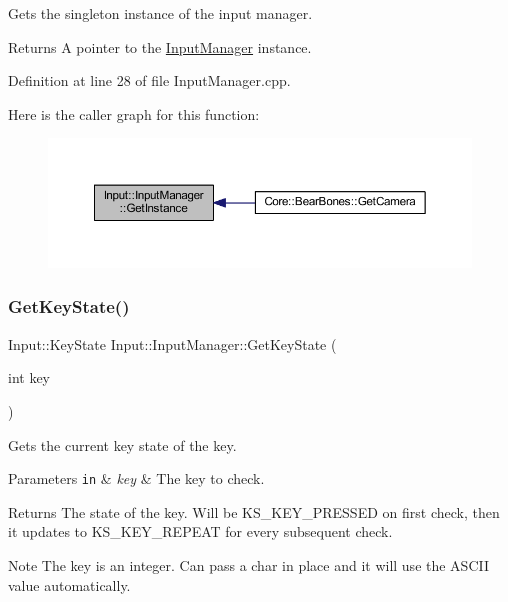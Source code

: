 Gets the singleton instance of the input manager. \begin{DoxyReturn}{Returns}
A pointer to the \hyperlink{class_input_1_1_input_manager}{Input\+Manager} instance. 
\end{DoxyReturn}


Definition at line 28 of file Input\+Manager.\+cpp.

Here is the caller graph for this function\+:
\nopagebreak
\begin{figure}[H]
\begin{center}
\leavevmode
\includegraphics[width=350pt]{class_input_1_1_input_manager_ac4df9b50e7cfc4e59f061a08ed7f4925_icgraph}
\end{center}
\end{figure}
\mbox{\label{class_input_1_1_input_manager_a6ac7c060e63c0f30563c29b9d2b41476}} 
\subsubsection{\texorpdfstring{Get\+Key\+State()}{GetKeyState()}}
{\footnotesize\ttfamily Input\+::\+Key\+State Input\+::\+Input\+Manager\+::\+Get\+Key\+State (\begin{DoxyParamCaption}\item[{int}]{key }\end{DoxyParamCaption})}

Gets the current key state of the key. 
\begin{DoxyParams}[1]{Parameters}
\mbox{\tt in}  & {\em key} & The key to check. \\
\hline
\end{DoxyParams}
\begin{DoxyReturn}{Returns}
The state of the key. Will be K\+S\+\_\+\+K\+E\+Y\+\_\+\+P\+R\+E\+S\+S\+ED on first check, then it updates to K\+S\+\_\+\+K\+E\+Y\+\_\+\+R\+E\+P\+E\+AT for every subsequent check. 
\end{DoxyReturn}
\begin{DoxyNote}{Note}
The key is an integer. Can pass a char in place and it will use the A\+S\+C\+II value automatically. 
\end{DoxyNote}


